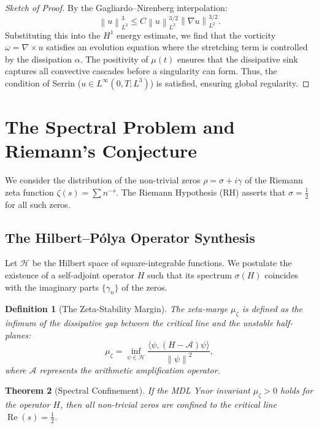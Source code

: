 \documentclass[11pt,a4paper]{amsart}
\newtheorem{theorem}{Theorem}[section]
\newtheorem{definition}[theorem]{Definition}
\newcommand{\alphacoeff}{\ensuremath{\alpha}}
\newcommand{\mumargin}{\ensuremath{\mu}}
\newcommand{\norm}[1]{\left\|#1\right\|}
\begin{document}
\begin{proof}[Sketch of Proof]
By the Gagliardo--Nirenberg interpolation:
\begin{equation}
    \norm{u}_{L^3}^3 \le C \norm{u}_{L^2}^{3/2} \norm{\nabla u}_{L^2}^{3/2}.
\end{equation}
Substituting this into the $H^1$ energy estimate, we find that the 
vorticity $\omega = \nabla \times u$ satisfies an evolution equation 
where the stretching term is controlled by the dissipation 
$\alphacoeff$. The positivity of $\mumargin(t)$ ensures that the 
dissipative sink captures all convective cascades before a singularity 
can form. Thus, the condition of Serrin ($u \in L^{\infty}(0, T; L^3)$) 
is satisfied, ensuring global regularity.
\end{proof}

\section{The Spectral Problem and Riemann's Conjecture}
We consider the distribution of the non-trivial zeros $\rho = \sigma + i\gamma$ 
of the Riemann zeta function $\zeta(s) = \sum n^{-s}$. The Riemann Hypothesis 
(RH) asserts that $\sigma = \tfrac{1}{2}$ for all such zeros.

\subsection{The Hilbert--Pólya Operator Synthesis}
Let $\mathcal{H}$ be the Hilbert space of square-integrable functions. We postulate 
the existence of a self-adjoint operator $H$ such that its spectrum 
$\sigma(H)$ coincides with the imaginary parts $\{\gamma_n\}$ of the zeros.

\begin{definition}[The Zeta-Stability Margin]
The zeta-marge $\mumargin_{\zeta}$ is defined as the infimum of the 
dissipative gap between the critical line and the unstable half-planes:
\begin{equation}
    \mumargin_{\zeta} = \inf_{\psi \in \mathcal{H}} \frac{\langle \psi, (H - \mathscr{A})\psi \rangle}{\norm{\psi}^2},
\end{equation}
where $\mathscr{A}$ represents the arithmetic amplification operator.
\end{definition}

\begin{theorem}[Spectral Confinement]
If the MDL Ynor invariant $\mumargin_{\zeta} > 0$ holds for the operator $H$, 
then all non-trivial zeros are confined to the critical line $\operatorname{Re}(s) = \tfrac{1}{2}$.
\end{theorem}
\end{document}
